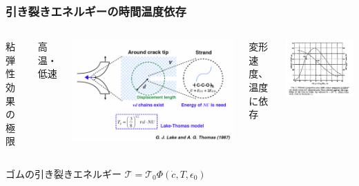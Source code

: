 \documentclass[12pt, dvipdfmx]{beamer}
\begin{document}
\begin{frame}
    \frametitle{引き裂きエネルギーの時間温度依存}
    
    
    \begin{columns}[totalwidth=1\textwidth]
    
    粘弾性効果の極限
    
    高温・低速
    
    \includegraphics[width=\textwidth]{./Lake_Thomas.png}
    
    
    変形速度、温度に依存
    
    \includegraphics[width=\textwidth]{./Time_Temp_2.png}
    
    \end{columns}
    
    \begin{alertblock}{ゴムの引き裂きエネルギー}
    $\mathcal{T}=\mathcal{T}_0 \Phi(\dot{c}, T, \epsilon_0)$
    \end{alertblock}
    
    \end{frame}
\end{document}
